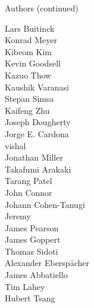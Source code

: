 \documentclass[xcolor=svgnames]{beamer}
\begin{document}
\begin{frame}{Authors (continued)}
\begin{multicols}{5}
          Lars Buitinck\\
          Konrad Meyer\\
          Kibeom Kim\\
          Kevin Goodsell\\
          Kazuo Thow\\
          Kaushik Varanasi\\
          Stepan Simsa\\
          Kaifeng Zhu\\
          Joseph Dougherty\\
          Jorge E. Cardona\\
          vishal\\
          Jonathan Miller\\
          Takafumi Arakaki\\
          Tarang Patel\\
          John Connor\\
          Johann Cohen-Tanugi\\
          Jeremy\\
          James Pearson\\
          James Goppert\\
          Thomas Sidoti\\
          Alexander Eberspächer\\
          James Abbatiello\\
          Tim Lahey\\
          Hubert Tsang\\
    \end{multicols}
  \end{frame}
\end{document}
